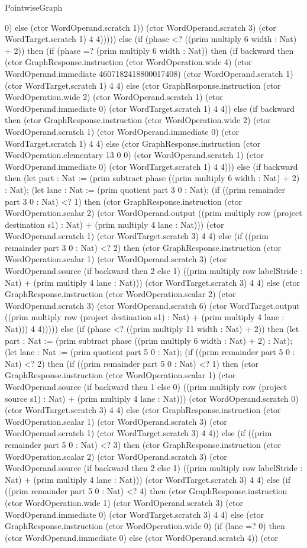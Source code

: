 \begin{lexlean}{PointwiseGraph}
\begin{semanticmodule}
{0) else (ctor WordOperand.scratch 1)) (ctor WordOperand.scratch 3) (ctor WordTarget.scratch 1) 4 4))))) else (if (phase <? ((prim multiply 6 width : Nat) + 2)) then (if (phase =? (prim multiply 6 width : Nat)) then (if backward then (ctor GraphResponse.instruction (ctor WordOperation.wide 4) (ctor WordOperand.immediate 4607182418800017408) (ctor WordOperand.scratch 1) (ctor WordTarget.scratch 1) 4 4) else (ctor GraphResponse.instruction (ctor WordOperation.wide 2) (ctor WordOperand.scratch 1) (ctor WordOperand.immediate 0) (ctor WordTarget.scratch 1) 4 4)) else (if backward then (ctor GraphResponse.instruction (ctor WordOperation.wide 2) (ctor WordOperand.scratch 1) (ctor WordOperand.immediate 0) (ctor WordTarget.scratch 1) 4 4) else (ctor GraphResponse.instruction (ctor WordOperation.elementary 13 0 0) (ctor WordOperand.scratch 1) (ctor WordOperand.immediate 0) (ctor WordTarget.scratch 1) 4 4))) else (if backward then (let part : Nat := (prim subtract phase ((prim multiply 6 width : Nat) + 2) : Nat); (let lane : Nat := (prim quotient part 3 0 : Nat); (if ((prim remainder part 3 0 : Nat) <? 1) then (ctor GraphResponse.instruction (ctor WordOperation.scalar 2) (ctor WordOperand.output ((prim multiply row (project destination s1) : Nat) + (prim multiply 4 lane : Nat))) (ctor WordOperand.scratch 1) (ctor WordTarget.scratch 3) 4 4) else (if ((prim remainder part 3 0 : Nat) <? 2) then (ctor GraphResponse.instruction (ctor WordOperation.scalar 1) (ctor WordOperand.scratch 3) (ctor WordOperand.source (if backward then 2 else 1) ((prim multiply row labelStride : Nat) + (prim multiply 4 lane : Nat))) (ctor WordTarget.scratch 3) 4 4) else (ctor GraphResponse.instruction (ctor WordOperation.scalar 2) (ctor WordOperand.scratch 3) (ctor WordOperand.scratch 6) (ctor WordTarget.output ((prim multiply row (project destination s1) : Nat) + (prim multiply 4 lane : Nat))) 4 4))))) else (if (phase <? ((prim multiply 11 width : Nat) + 2)) then (let part : Nat := (prim subtract phase ((prim multiply 6 width : Nat) + 2) : Nat); (let lane : Nat := (prim quotient part 5 0 : Nat); (if ((prim remainder part 5 0 : Nat) <? 2) then (if ((prim remainder part 5 0 : Nat) <? 1) then (ctor GraphResponse.instruction (ctor WordOperation.scalar 1) (ctor WordOperand.source (if backward then 1 else 0) ((prim multiply row (project source s1) : Nat) + (prim multiply 4 lane : Nat))) (ctor WordOperand.scratch 0) (ctor WordTarget.scratch 3) 4 4) else (ctor GraphResponse.instruction (ctor WordOperation.scalar 1) (ctor WordOperand.scratch 3) (ctor WordOperand.scratch 1) (ctor WordTarget.scratch 3) 4 4)) else (if ((prim remainder part 5 0 : Nat) <? 3) then (ctor GraphResponse.instruction (ctor WordOperation.scalar 2) (ctor WordOperand.scratch 3) (ctor WordOperand.source (if backward then 2 else 1) ((prim multiply row labelStride : Nat) + (prim multiply 4 lane : Nat))) (ctor WordTarget.scratch 3) 4 4) else (if ((prim remainder part 5 0 : Nat) <? 4) then (ctor GraphResponse.instruction (ctor WordOperation.wide 1) (ctor WordOperand.scratch 3) (ctor WordOperand.immediate 0) (ctor WordTarget.scratch 3) 4 4) else (ctor GraphResponse.instruction (ctor WordOperation.wide 0) (if (lane =? 0) then (ctor WordOperand.immediate 0) else (ctor WordOperand.scratch 4)) (ctor }
\end{semanticmodule}
\end{lexlean}
